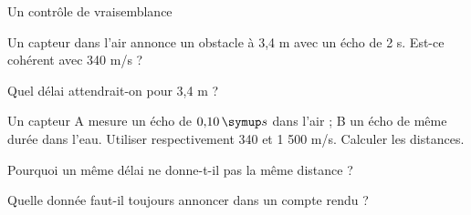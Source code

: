 \par\noindent\begin{minipage}{\linewidth}
\begin{exercice}[3]{Un contrôle de vraisemblance}
\begin{questions}
\item Un capteur dans l’air annonce un obstacle à 3,4 m avec un écho de 2 s. Est-ce cohérent avec 340 m/s ?
\item Quel délai attendrait-on pour 3,4 m ?
\end{questions}
\end{exercice}
\end{minipage}
\label{defi-ex-17}
\begin{questions}
\item Un capteur A mesure un écho de $0{,}10\unite s$ dans l’air ; B un écho de même durée dans l’eau. Utiliser respectivement 340 et 1 500 m/s. Calculer les distances.
\item Pourquoi un même délai ne donne-t-il pas la même distance ?
\item Quelle donnée faut-il toujours annoncer dans un compte rendu ?
\end{questions}
\pcGrille
